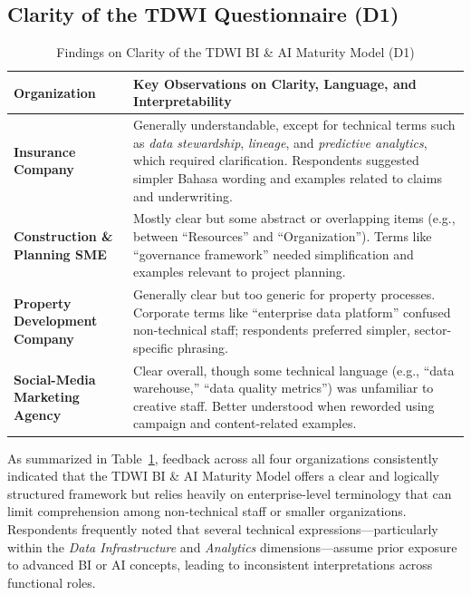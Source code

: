 \documentclass[conference]{IEEEtran}
\begin{document}
\subsection{Clarity of the TDWI Questionnaire (D1)}
\label{sec:clarity_results}

\begin{table}[h!]
\centering
\caption{Findings on Clarity of the TDWI BI \& AI Maturity Model (D1)}
\label{tab:d1_clarity}
\renewcommand{\arraystretch}{1.2}
\begin{tabular}{p{.16\linewidth} p{.74\linewidth}}
\hline
\textbf{Organization} & \textbf{Key Observations on Clarity, Language, and Interpretability} \\ \hline

\textbf{Insurance Company} & 
Generally understandable, except for technical terms such as \emph{data stewardship}, \emph{lineage}, and \emph{predictive analytics}, which required clarification.  
Respondents suggested simpler Bahasa wording and examples related to claims and underwriting. \\ \hline

\textbf{Construction \& Planning SME} & 
Mostly clear but some abstract or overlapping items (e.g., between “Resources” and “Organization”).  
Terms like “governance framework” needed simplification and examples relevant to project planning. \\ \hline

\textbf{Property Development Company} & 
Generally clear but too generic for property processes.  
Corporate terms like “enterprise data platform” confused non-technical staff; respondents preferred simpler, sector-specific phrasing. \\ \hline

\textbf{Social-Media Marketing Agency} & 
Clear overall, though some technical language (e.g., “data warehouse,” “data quality metrics”) was unfamiliar to creative staff.  
Better understood when reworded using campaign and content-related examples. \\ \hline
\end{tabular}
\end{table}


As summarized in Table~\ref{tab:d1_clarity}, feedback across all four organizations consistently indicated that the TDWI BI \& AI Maturity Model offers a clear and logically structured framework but relies heavily on enterprise-level terminology that can limit comprehension among non-technical staff or smaller organizations. Respondents frequently noted that several technical expressions—particularly within the \textit{Data Infrastructure} and \textit{Analytics} dimensions—assume prior exposure to advanced BI or AI concepts, leading to inconsistent interpretations across functional roles.
\end{document}
